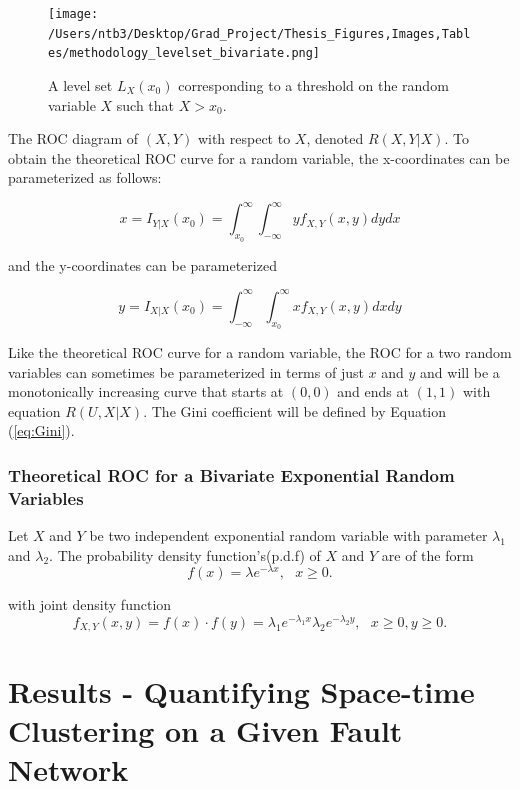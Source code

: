 \documentclass[12pt]{article} %
\theoremstyle{plain}
\begin{document}
\begin{figure} [!htbp]
	\centering
	\texttt{[image:  /Users/ntb3/Desktop/Grad\_Project/Thesis\_Figures,Images,Tables/methodology\_levelset\_bivariate.png]}
	\caption{A level set $L_X(x_0)$ corresponding to a threshold on the random variable $X$ such that $X>x_0$.
	}
	\label{fig:bivariate_levelset}
\end{figure}


The ROC diagram of $(X,Y)$ with respect to $X$, denoted $R(X,Y|X)$. To obtain the theoretical ROC curve for a random variable, the x-coordinates can be parameterized as follows:

\begin{equation} \label{eq:xcoord_bivariate}
	x=I_{Y|X}(x_0)= \int_{x_0}^{\infty}\int_{-\infty}^{\infty} y f_{X,Y}(x,y)dy dx
\end{equation}

and the y-coordinates can be parameterized 

\begin{equation} \label{eq:ycoord_bivariate}
	y= I_{X|X}(x_0)=\int_{-\infty}^{\infty}\int_{x_0}^{\infty} x f_{X,Y}(x,y)dx dy
\end{equation}

Like the theoretical ROC curve for a random variable, the ROC for a two random variables can sometimes be parameterized in terms of just $x$ and $y$ and will be a monotonically increasing curve that starts at $(0, 0)$ and ends at $(1, 1)$ with equation $R(U,X|X)$. The Gini coefficient will be defined by Equation (\ref{eq:Gini}).

\subsubsection{Theoretical ROC for a Bivariate Exponential Random Variables}

Let $X$ and $Y$ be two independent exponential random variable with parameter $\lambda_1$ and $\lambda_2$. The probability density function's(p.d.f) of $X$ and $Y$ are of the form
\begin{equation}
	f(x) = \lambda e^{-\lambda x}, \ \ \  x \geq 0.
\end{equation}

with joint density function
\begin{equation}
	f_{X,Y}(x,y) = f(x) \cdot f(y)= \lambda_1  e^{-\lambda_1x}\lambda_2 e^{-\lambda_2 y}, \ \ \ x \geq 0,  y \geq 0.
\end{equation}


\section{Results - Quantifying Space-time Clustering on a Given Fault Network }
\end{document}
